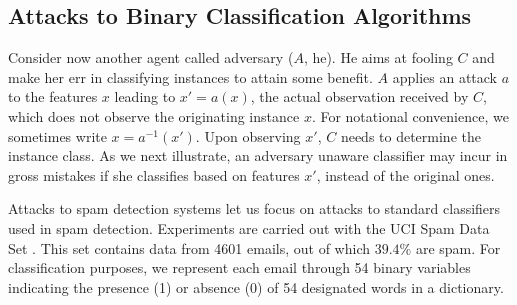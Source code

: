  

\subsection{Attacks to Binary Classification Algorithms} \label{sec:att_class}

Consider now another agent called adversary ($A$, he).
He aims at fooling $C$ and make her err in classifying instances to attain some benefit. 
$A$ applies an attack $a$ to the features $x$ leading to $x'=a(x)$, the actual observation received by $C$, which does 
not observe the originating instance $x$.
For notational convenience, we sometimes write $x=a^{-1} (x')$.
Upon observing $x'$, $C$ needs to determine the instance  class. 
As we next illustrate, an adversary unaware classifier
may incur in gross mistakes if she classifies based on features $x'$, instead of the original ones.

Attacks to spam detection systems let us focus on attacks to standard classifiers used in spam detection. Experiments are carried out with the UCI Spam Data Set \cite{spambase1999}.
This set contains data from 4601 emails, out of which $39.4 \%$ are spam. For classification purposes, we represent each email through 54 binary variables indicating the presence (1) or absence (0) of 54 designated words in a dictionary.

